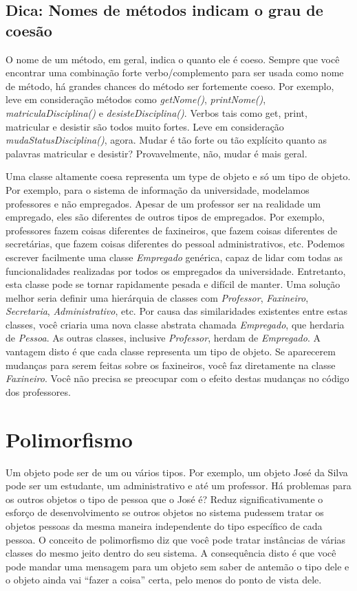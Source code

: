 \documentclass[
	article,			%
	12pt,				%
	openright,
	twoside,			%
	a4paper,			%
	english,			%
	french,
	brazil,				%
	sumario=tradicional
	]{abntex2}
\begin{document}
\subsection{Dica: Nomes de métodos indicam o grau de coesão}
O nome de um método, em geral, indica o quanto ele é coeso. Sempre que você encontrar uma combinação forte verbo/complemento para ser usada como nome de método, há grandes chances do método ser fortemente coeso. Por exemplo, leve em consideração métodos como \emph{getNome()}, \emph{printNome()}, \emph{matriculaDisciplina()} e \emph{desisteDisciplina()}. Verbos tais como get, print, matricular e desistir são todos muito fortes. Leve em consideração \emph{mudaStatusDisciplina()}, agora. Mudar é tão forte ou tão explícito quanto as palavras matricular e desistir? Provavelmente, não, mudar é mais geral.

Uma classe altamente coesa representa um type de objeto e só um tipo de objeto. Por exemplo, para o sistema de informação da universidade, modelamos professores e não empregados. Apesar de um professor ser na realidade um empregado, eles são diferentes de outros tipos de empregados. Por exemplo, professores fazem coisas diferentes de faxineiros, que fazem coisas diferentes de secretárias, que fazem coisas diferentes do pessoal administrativos, etc. Podemos escrever facilmente uma classe \emph{Empregado} genérica, capaz de lidar com todas as funcionalidades realizadas por todos os empregados da universidade. Entretanto, esta classe pode se tornar rapidamente pesada e difícil de manter. Uma solução melhor seria definir uma hierárquia de classes com \emph{Professor}, \emph{Faxineiro}, \emph{Secretaria}, \emph{Administrativo}, etc. Por causa das similaridades existentes entre estas classes, você criaria uma nova classe abstrata chamada \emph{Empregado}, que herdaria de \emph{Pessoa}. As outras classes, inclusive \emph{Professor}, herdam de \emph{Empregado}. A vantagem disto é que cada classe representa um tipo de objeto. Se aparecerem mudanças para serem feitas sobre os faxineiros, você faz diretamente na classe \emph{Faxineiro}. Você não precisa se preocupar com o efeito destas mudanças no código dos professores. 

\section{Polimorfismo}

Um objeto pode ser de um ou vários tipos. Por exemplo, um objeto José da Silva pode ser um estudante, um administrativo e até um professor. Há problemas para os outros objetos o tipo de pessoa que o José é? Reduz significativamente o esforço de desenvolvimento se outros objetos no sistema pudessem tratar os objetos pessoas da mesma maneira independente do tipo específico de cada pessoa. O conceito de polimorfismo diz que você pode tratar instâncias de várias classes do mesmo jeito dentro do seu sistema. A consequência disto é que você pode mandar uma mensagem para um objeto sem saber de antemão o tipo dele e o objeto ainda vai ``fazer a coisa'' certa, pelo menos do ponto de vista dele.
\end{document}
